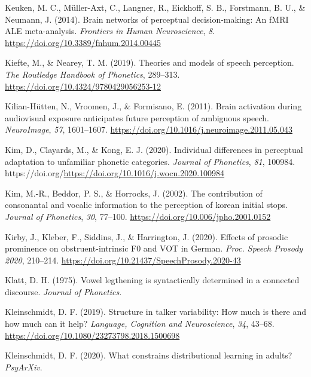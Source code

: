 \documentclass[
  11pt,
  english,
  man,floatsintext]{apa6}
\newlength{\cslhangindent}
\newlength{\cslentryspacingunit} %
\newenvironment{CSLReferences}[2] %
 {%
  \setlength{\parindent}{0pt}
  \ifodd #1
  \let\oldpar\par
  \def\par{\hangindent=\cslhangindent\oldpar}
  \fi
  \setlength{\parskip}{#2\cslentryspacingunit}
 }%
 {}
\begin{document}
\begin{CSLReferences}{1}{0}
\leavevmode{}%
Keuken, M. C., Müller-Axt, C., Langner, R., Eickhoff, S. B., Forstmann, B. U., \& Neumann, J. (2014). Brain networks of perceptual decision-making: An fMRI ALE meta-analysis. \emph{Frontiers in Human Neuroscience}, \emph{8}. \url{https://doi.org/10.3389/fnhum.2014.00445}

\leavevmode{}%
Kiefte, M., \& Nearey, T. M. (2019). Theories and models of speech perception. \emph{The Routledge Handbook of Phonetics}, 289--313. \url{https://doi.org/10.4324/9780429056253-12}

\leavevmode{}%
Kilian-Hütten, N., Vroomen, J., \& Formisano, E. (2011). Brain activation during audiovisual exposure anticipates future perception of ambiguous speech. \emph{NeuroImage}, \emph{57}, 1601--1607. \url{https://doi.org/10.1016/j.neuroimage.2011.05.043}

\leavevmode{}%
Kim, D., Clayards, M., \& Kong, E. J. (2020). Individual differences in perceptual adaptation to unfamiliar phonetic categories. \emph{Journal of Phonetics}, \emph{81}, 100984. https://doi.org/\url{https://doi.org/10.1016/j.wocn.2020.100984}

\leavevmode{}%
Kim, M.-R., Beddor, P. S., \& Horrocks, J. (2002). The contribution of consonantal and vocalic information to the perception of korean initial stops. \emph{Journal of Phonetics}, \emph{30}, 77--100. \url{https://doi.org/10.006/jpho.2001.0152}

\leavevmode{}%
Kirby, J., Kleber, F., Siddins, J., \& Harrington, J. (2020). {Effects of prosodic prominence on obstruent-intrinsic F0 and VOT in German}. \emph{Proc. Speech Prosody 2020}, 210--214. \url{https://doi.org/10.21437/SpeechProsody.2020-43}

\leavevmode{}%
Klatt, D. H. (1975). Vowel legthening is syntactically determined in a connected discourse. \emph{Journal of Phonetics}.

\leavevmode{}%
Kleinschmidt, D. F. (2019). Structure in talker variability: How much is there and how much can it help? \emph{Language, Cognition and Neuroscience}, \emph{34}, 43--68. \url{https://doi.org/10.1080/23273798.2018.1500698}

\leavevmode{}%
Kleinschmidt, D. F. (2020). What constrains distributional learning in adults? \emph{PsyArXiv}.


\end{CSLReferences}
\end{document}
